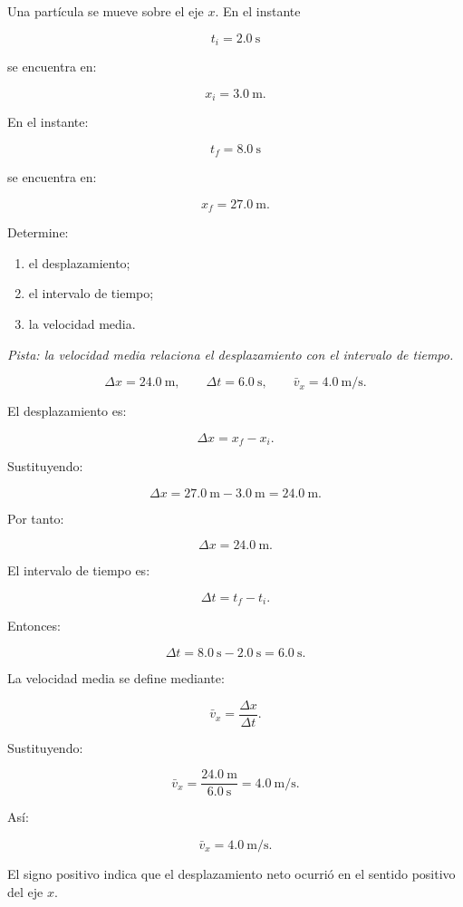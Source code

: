 ﻿\nivelbasico


\begin{ejercicio}
Una partícula se mueve sobre el eje \(x\). En el instante

\[ t_i=\SI{2.0}{\second} \]

se encuentra en:

\[ x_i=\SI{3.0}{\meter}. \]

En el instante:

\[ t_f=\SI{8.0}{\second} \]

se encuentra en:

\[ x_f=\SI{27.0}{\meter}. \]

Determine:

\begin{enumerate}[label=\alph*)]
    \item el desplazamiento;
    \item el intervalo de tiempo;
    \item la velocidad media.
\end{enumerate}

\textit{Pista: la velocidad media relaciona el desplazamiento con el intervalo de tiempo.}
\end{ejercicio}

\begin{respuesta}
\[
\Delta x=\SI{24.0}{\meter},
\qquad
\Delta t=\SI{6.0}{\second},
\qquad
\bar{v}_x=\SI{4.0}{\meter\per\second}.
\]
\end{respuesta}

\begin{explicacion}
El desplazamiento es:

\[ \Delta x=x_f-x_i. \]

Sustituyendo:

\[
\Delta x
=
\SI{27.0}{\meter}
-
\SI{3.0}{\meter}
=
\SI{24.0}{\meter}.
\]

Por tanto:

\[ \boxed{\Delta x=\SI{24.0}{\meter}}. \]

El intervalo de tiempo es:

\[ \Delta t=t_f-t_i. \]

Entonces:

\[
\Delta t
=
\SI{8.0}{\second}
-
\SI{2.0}{\second}
=
\SI{6.0}{\second}.
\]

La velocidad media se define mediante:

\[ \bar{v}_x=\frac{\Delta x}{\Delta t}. \]

Sustituyendo:

\[
\bar{v}_x
=
\frac{\SI{24.0}{\meter}}
{\SI{6.0}{\second}}
=
\SI{4.0}{\meter\per\second}.
\]

Así:

\[ \boxed{\bar{v}_x=\SI{4.0}{\meter\per\second}}. \]

El signo positivo indica que el desplazamiento neto ocurrió en el sentido positivo del eje \(x\).
\end{explicacion}


